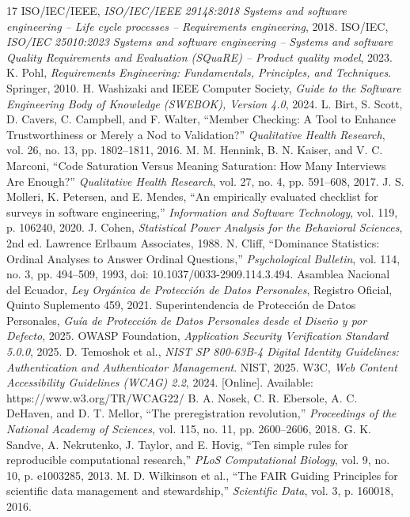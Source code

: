 \documentclass[11pt,a4paper,twoside]{article}
\begin{document}
\clearpage
\begin{thebibliography}{17}
 ISO/IEC/IEEE, \emph{ISO/IEC/IEEE 29148:2018 Systems and software engineering -- Life cycle processes -- Requirements engineering}, 2018.
 ISO/IEC, \emph{ISO/IEC 25010:2023 Systems and software engineering -- Systems and software Quality Requirements and Evaluation (SQuaRE) -- Product quality model}, 2023.
 K. Pohl, \emph{Requirements Engineering: Fundamentals, Principles, and Techniques}. Springer, 2010.
 H. Washizaki and IEEE Computer Society, \emph{Guide to the Software Engineering Body of Knowledge (SWEBOK), Version 4.0}, 2024.
 L. Birt, S. Scott, D. Cavers, C. Campbell, and F. Walter, ``Member Checking: A Tool to Enhance Trustworthiness or Merely a Nod to Validation?'' \emph{Qualitative Health Research}, vol. 26, no. 13, pp. 1802--1811, 2016.
 M. M. Hennink, B. N. Kaiser, and V. C. Marconi, ``Code Saturation Versus Meaning Saturation: How Many Interviews Are Enough?'' \emph{Qualitative Health Research}, vol. 27, no. 4, pp. 591--608, 2017.
 J. S. Molleri, K. Petersen, and E. Mendes, ``An empirically evaluated checklist for surveys in software engineering,'' \emph{Information and Software Technology}, vol. 119, p. 106240, 2020.
 J. Cohen, \emph{Statistical Power Analysis for the Behavioral Sciences}, 2nd ed. Lawrence Erlbaum Associates, 1988.
 N. Cliff, ``Dominance Statistics: Ordinal Analyses to Answer Ordinal Questions,'' \emph{Psychological Bulletin}, vol. 114, no. 3, pp. 494--509, 1993, doi: 10.1037/0033-2909.114.3.494.
 Asamblea Nacional del Ecuador, \emph{Ley Orgánica de Protección de Datos Personales}, Registro Oficial, Quinto Suplemento 459, 2021.
 Superintendencia de Protección de Datos Personales, \emph{Guía de Protección de Datos Personales desde el Diseño y por Defecto}, 2025.
 OWASP Foundation, \emph{Application Security Verification Standard 5.0.0}, 2025.
 D. Temoshok et al., \emph{NIST SP 800-63B-4 Digital Identity Guidelines: Authentication and Authenticator Management}. NIST, 2025.
 W3C, \emph{Web Content Accessibility Guidelines (WCAG) 2.2}, 2024. [Online]. Available: https://www.w3.org/TR/WCAG22/
 B. A. Nosek, C. R. Ebersole, A. C. DeHaven, and D. T. Mellor, ``The preregistration revolution,'' \emph{Proceedings of the National Academy of Sciences}, vol. 115, no. 11, pp. 2600--2606, 2018.
 G. K. Sandve, A. Nekrutenko, J. Taylor, and E. Hovig, ``Ten simple rules for reproducible computational research,'' \emph{PLoS Computational Biology}, vol. 9, no. 10, p. e1003285, 2013.
 M. D. Wilkinson et al., ``The FAIR Guiding Principles for scientific data management and stewardship,'' \emph{Scientific Data}, vol. 3, p. 160018, 2016.
\end{thebibliography}
\end{document}
